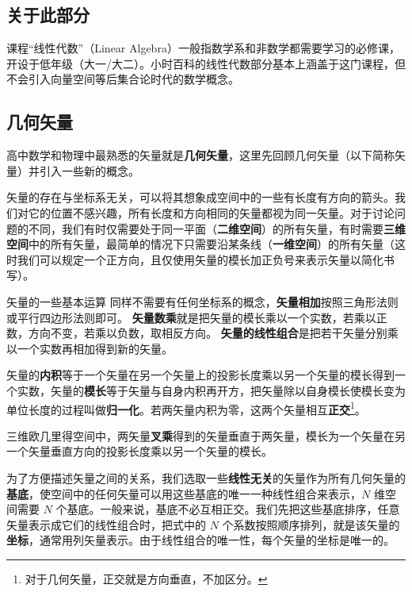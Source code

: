 
\begin{issues}
\issueDraft
\end{issues}

\subsection{关于此部分}

课程“线性代数”（Linear Algebra）一般指数学系和非数学都需要学习的必修课，开设于低年级（大一/大二）。小时百科的线性代数部分基本上涵盖于这门课程，但不会引入向量空间等后集合论时代的数学概念。



\subsection{几何矢量}
高中数学和物理中最熟悉的矢量就是\textbf{几何矢量}，这里先回顾几何矢量（以下简称矢量）并引入一些新的概念。

矢量的存在与坐标系无关，可以将其想象成空间中的一些有长度有方向的箭头。我们对它的位置不感兴趣，所有长度和方向相同的矢量都视为同一矢量。对于讨论问题的不同，我们有时仅需要处于同一平面（\textbf{二维空间}）的所有矢量，有时需要\textbf{三维空间}中的所有矢量，最简单的情况下只需要沿某条线（\textbf{一维空间}）的所有矢量（这时我们可以规定一个正方向，且仅使用矢量的模长加正负号来表示矢量以简化书写）。

矢量的一些基本运算 同样不需要有任何坐标系的概念，\textbf{矢量相加}按照三角形法则或平行四边形法则即可。
\textbf{矢量数乘}就是把矢量的模长乘以一个实数，若乘以正数，方向不变，若乘以负数，取相反方向。 \textbf{矢量的线性组合}是把若干矢量分别乘以一个实数再相加得到新的矢量。

矢量的\textbf{内积}等于一个矢量在另一个矢量上的投影长度乘以另一个矢量的模长得到一个实数，矢量的\textbf{模长}等于矢量与自身内积再开方，把矢量除以自身模长使模长变为单位长度的过程叫做\textbf{归一化}。若两矢量内积为零，这两个矢量相互\textbf{正交}\footnote{对于几何矢量，正交就是方向垂直，不加区分。}。

三维欧几里得空间中，两矢量\textbf{叉乘}得到的矢量垂直于两矢量，模长为一个矢量在另一个矢量垂直方向的投影长度乘以另一个矢量的模长。

为了方便描述矢量之间的关系，我们选取一些\textbf{线性无关}的矢量作为所有几何矢量的\textbf{基底}，使空间中的任何矢量可以用这些基底的唯一一种线性组合来表示，$N$ 维空间需要 $N$ 个基底。一般来说，基底不必互相正交。我们先把这些基底排序，任意矢量表示成它们的线性组合时，把式中的 $N$ 个系数按照顺序排列，就是该矢量的\textbf{坐标}，通常用列矢量表示。由于线性组合的唯一性，每个矢量的坐标是唯一的。

